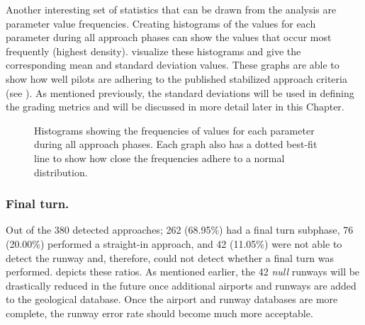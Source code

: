     
    Another interesting set of statistics that can be drawn from the analysis are parameter value frequencies.  Creating histograms of the values for each parameter during all approach phases can show the values that occur most frequently (highest density).   visualize these histograms and give the corresponding mean and standard deviation values.  These graphs are able to show how well pilots are adhering to the published stabilized approach criteria (see ).  As mentioned previously, the standard deviations will be used in defining the grading metrics and will be discussed in more detail later in this Chapter.
    
    \begin{figure}
    	\centering
        \hfill%
        
        \hfill%
        \caption{Histograms showing the frequencies of values for each parameter during all approach phases.  Each graph also has a dotted best-fit line to show how close the frequencies adhere to a normal distribution.}
        \label{fig:approach_histograms}
    \end{figure}
    
    
        \subsubsection{Final turn.}
        
        	Out of the 380 detected approaches; 262 (68.95\%) had a final turn subphase, 76 (20.00\%) performed a straight-in approach, and 42 (11.05\%) were not able to detect the runway and, therefore, could not detect whether a final turn was performed.   depicts these ratios.  As mentioned earlier, the 42 \textit{null} runways will be drastically reduced in the future once additional airports and runways are added to the geological database.  Once the airport and runway databases are more complete, the runway error rate should become much more acceptable.
            
